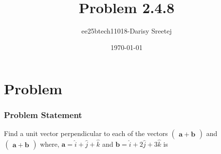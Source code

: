 \documentclass{beamer}
\title{Problem 2.4.8}
\author{ee25btech11018-Darisy Sreetej}
\date{\today}
\theoremstyle{remark}
\newcommand{\myvec}[1]{\ensuremath{\begin{pmatrix}#1\end{pmatrix}}}
\let\vec\mathbf
\numberwithin{equation}{section}
\begin{document}
\begin{frame}
\titlepage
\end{frame}

\section{Problem}
\begin{frame}
\frametitle{Problem Statement}
%
Find a unit vector perpendicular to each of the vectors $\myvec{\vec{a}+\vec{b}}$ and $\myvec{\vec{a}+\vec{b}}$ where, $\vec{a} = \hat{i} + \hat{j} + \hat{k}$ and $\vec{b} = \hat{i} + 2\hat{j} + 3\hat{k} $ is
\end{frame}
\end{document}
